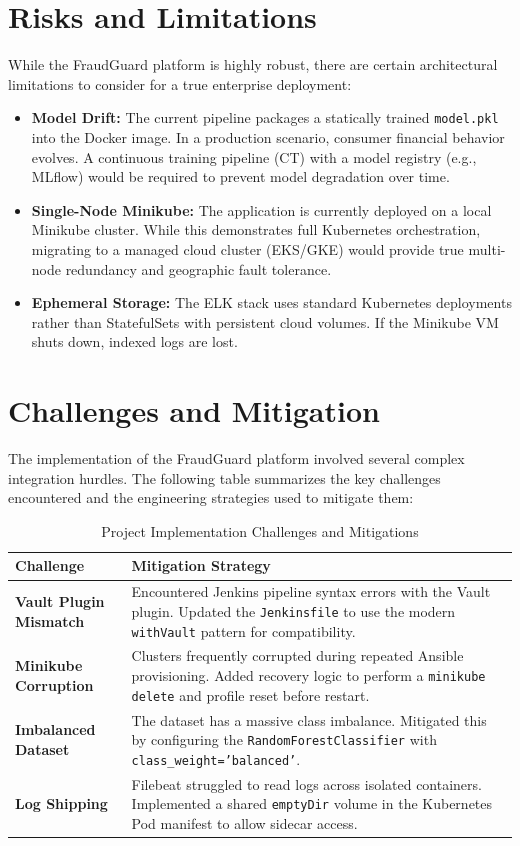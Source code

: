 \documentclass[12pt,a4paper]{article}
\begin{document}
\section{Risks and Limitations}
While the FraudGuard platform is highly robust, there are certain architectural limitations to consider for a true enterprise deployment:
\begin{itemize}
    \item \textbf{Model Drift:} The current pipeline packages a statically trained \texttt{model.pkl} into the Docker image. In a production scenario, consumer financial behavior evolves. A continuous training pipeline (CT) with a model registry (e.g., MLflow) would be required to prevent model degradation over time.
    \item \textbf{Single-Node Minikube:} The application is currently deployed on a local Minikube cluster. While this demonstrates full Kubernetes orchestration, migrating to a managed cloud cluster (EKS/GKE) would provide true multi-node redundancy and geographic fault tolerance.
    \item \textbf{Ephemeral Storage:} The ELK stack uses standard Kubernetes deployments rather than StatefulSets with persistent cloud volumes. If the Minikube VM shuts down, indexed logs are lost.
\end{itemize}

\section{Challenges and Mitigation}
The implementation of the FraudGuard platform involved several complex integration hurdles. The following table summarizes the key challenges encountered and the engineering strategies used to mitigate them:

\begin{table}[H]
\centering
\caption{Project Implementation Challenges and Mitigations}
\vspace{1em}
\renewcommand{\arraystretch}{1.5}
\begin{tabularx}{\textwidth}{|l|X|}
\hline
\textbf{Challenge} & \textbf{Mitigation Strategy} \\ \hline
\textbf{Vault Plugin Mismatch} & Encountered Jenkins pipeline syntax errors with the Vault plugin. Updated the \texttt{Jenkinsfile} to use the modern \texttt{withVault} pattern for compatibility. \\ \hline
\textbf{Minikube Corruption} & Clusters frequently corrupted during repeated Ansible provisioning. Added recovery logic to perform a \texttt{minikube delete} and profile reset before restart. \\ \hline
\textbf{Imbalanced Dataset} & The dataset has a massive class imbalance. Mitigated this by configuring the \texttt{RandomForestClassifier} with \texttt{class\_weight='balanced'}. \\ \hline
\textbf{Log Shipping} & Filebeat struggled to read logs across isolated containers. Implemented a shared \texttt{emptyDir} volume in the Kubernetes Pod manifest to allow sidecar access. \\ \hline
\end{tabularx}
\end{table}
\end{document}
